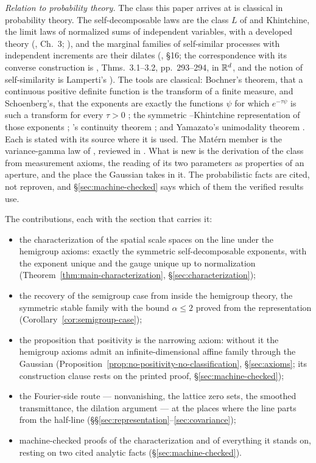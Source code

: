\emph{Relation to probability theory.} The class this paper arrives at is classical in
probability theory. The self-decomposable laws are the class $L$ of \Levy{} and Khintchine, the limit
laws of normalized sums of independent variables, with a developed theory
(, Ch.~3; ), and the marginal families of
self-similar processes with independent increments are their dilates
(, \S16; the correspondence with its converse construction is
, Thms.~3.1--3.2, pp.~293--294, in $\mathbb{R}^d$, and the notion of
self-similarity is Lamperti's ).
The tools are classical: Bochner's theorem, that a continuous positive definite function is
the transform of a finite measure, and Schoenberg's, that the exponents are exactly the
functions $\psi$ for which $e^{-\tau\psi}$ is such a transform for every $\tau > 0$
; the symmetric \Levy--Khintchine representation
of those exponents ; \Levy's continuity theorem
; and Yamazato's unimodality theorem
. Each is stated with its source where it is used. The
Mat\'ern member is the variance-gamma law of , reviewed in
. What is new is the derivation of the class from measurement
axioms, the reading of its two parameters as properties of an aperture, and the place the
Gaussian takes in it. The probabilistic facts are cited, not reproven, and
\S\ref{sec:machine-checked} says which of them the verified results use.

The contributions, each with the section that carries it:
\begin{itemize}
\item the characterization of the spatial scale spaces on the line under the hemigroup
  axioms: exactly the symmetric self-decomposable exponents, with the exponent unique and
  the gauge unique up to normalization
  (Theorem~\ref{thm:main-characterization}, \S\ref{sec:characterization});
\item the recovery of the semigroup case from inside the hemigroup theory, the symmetric
  stable family with the bound $\alpha \le 2$ proved from the representation
  (Corollary~\ref{cor:semigroup-case});
\item the proposition that positivity is the narrowing axiom: without it the hemigroup
  axioms admit an infinite-dimensional affine family through the Gaussian
  (Proposition~\ref{prop:no-positivity-no-classification}, \S\ref{sec:axioms}; its
  construction clause rests on the printed proof, \S\ref{sec:machine-checked});
\item the Fourier-side route --- nonvanishing, the lattice zero sets, the smoothed
  transmittance, the dilation argument --- at the places where the line parts from the
  half-line (\S\S\ref{sec:representation}--\ref{sec:covariance});
\item machine-checked proofs of the characterization and of everything it stands on,
  resting on two cited analytic facts (\S\ref{sec:machine-checked}).
\end{itemize}

